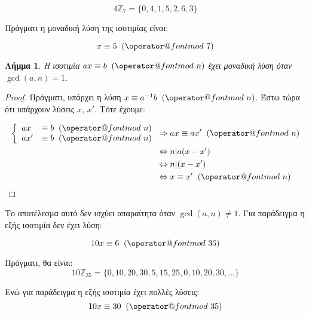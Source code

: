 \documentclass[11pt,a4paper]{book}
\makeatletter
\newtheorem*{lemma}{Λήμμα}
\def\imod#1{\allowbreak\mkern10mu({\operator@font mod}\,\,#1)}
\makeatother
\begin{document}
\[
4 \mathbb{Z}_7 = \{ 0, 4, 1, 5, 2, 6, 3 \}
\]

Πράγματι η μοναδική λύση της ισοτιμίας είναι:

\[
x \equiv 5 \imod 7
\]

\begin{lemma}
Η ισοτιμία $ax \equiv b \imod n$ έχει μοναδική λύση όταν $\gcd( a, n ) = 1$.
\end{lemma}
\begin{proof}
Πράγματι, υπάρχει η λύση $x \equiv a^{-1}b \imod n$. Έστω τώρα ότι υπάρχουν λύσεις $x$, $x'$. Τότε έχουμε:

\begin{align*}
	\left\{ \begin{array}{ll}
         ax &\equiv b \imod n\\
         ax' &\equiv b \imod n\end{array} \right.
    &\Rightarrow ax \equiv ax' \imod n\\
    &\Leftrightarrow n|a(x - x')\\
    &\Leftrightarrow n|(x - x')\\
    &\Leftrightarrow x \equiv x' \imod n
\end{align*}
\end{proof}

Το αποτέλεσμα αυτό δεν ισχύει απαραίτητα όταν $\gcd( a, n ) \neq 1$. Για παράδειγμα η εξής ισοτιμία δεν έχει λύση:

\[
10x \equiv 6 \imod{35}
\]

Πράγματι, θα είναι:
\[
10\mathbb{Z}_{35} = \{ 0, 10, 20, 30, 5, 15, 25, 0, 10, 20, 30, \dots \}
\]

Ενώ για παράδειγμα η εξής ισοτιμία έχει πολλές λύσεις:
\[
10x \equiv 30 \imod{35}
\]
\end{document}
